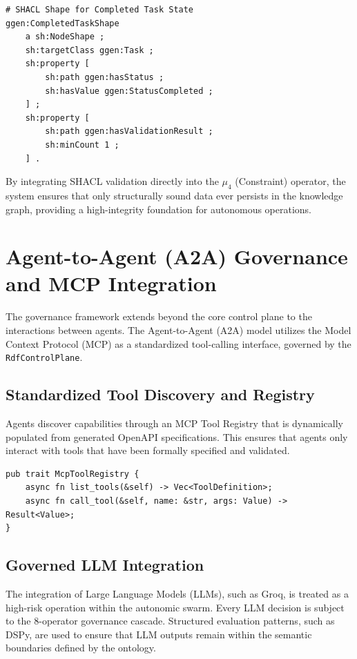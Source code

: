 \begin{verbatim}
# SHACL Shape for Completed Task State
ggen:CompletedTaskShape
    a sh:NodeShape ;
    sh:targetClass ggen:Task ;
    sh:property [
        sh:path ggen:hasStatus ;
        sh:hasValue ggen:StatusCompleted ;
    ] ;
    sh:property [
        sh:path ggen:hasValidationResult ;
        sh:minCount 1 ;
    ] .
\end{verbatim}

By integrating SHACL validation directly into the $\mu_4$ (Constraint) operator, the system ensures that only structurally sound data ever persists in the knowledge graph, providing a high-integrity foundation for autonomous operations.

\section{Agent-to-Agent (A2A) Governance and MCP Integration}

The governance framework extends beyond the core control plane to the interactions between agents. The Agent-to-Agent (A2A) model utilizes the Model Context Protocol (MCP) as a standardized tool-calling interface, governed by the \texttt{RdfControlPlane}.

\subsection{Standardized Tool Discovery and Registry}

Agents discover capabilities through an MCP Tool Registry that is dynamically populated from generated OpenAPI specifications. This ensures that agents only interact with tools that have been formally specified and validated.

\begin{verbatim}
pub trait McpToolRegistry {
    async fn list_tools(&self) -> Vec<ToolDefinition>;
    async fn call_tool(&self, name: &str, args: Value) -> Result<Value>;
}
\end{verbatim}

\subsection{Governed LLM Integration}

The integration of Large Language Models (LLMs), such as Groq, is treated as a high-risk operation within the autonomic swarm. Every LLM decision is subject to the 8-operator governance cascade. Structured evaluation patterns, such as DSPy, are used to ensure that LLM outputs remain within the semantic boundaries defined by the ontology.

